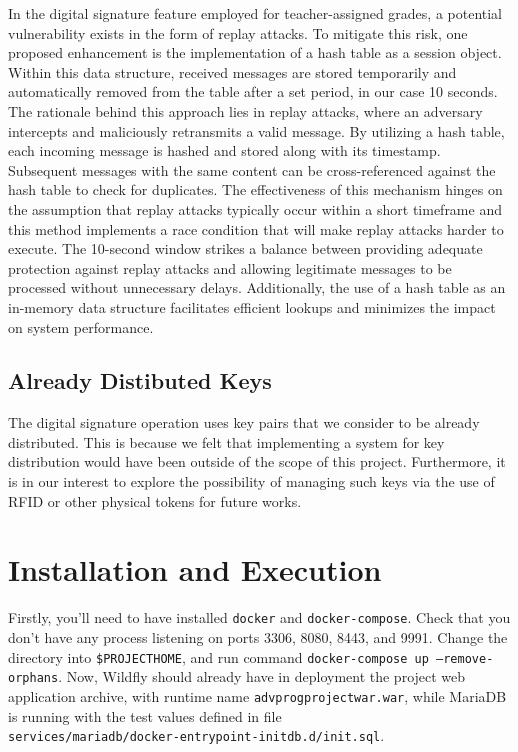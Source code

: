 In the digital signature feature employed for teacher-assigned grades, a potential vulnerability exists in the form of replay attacks. To mitigate this risk, one proposed enhancement is the implementation of a hash table as a session object. Within this data structure, received messages are stored temporarily and automatically removed from the table after a set period, in our case 10 seconds. The rationale behind this approach lies in replay attacks, where an adversary intercepts and maliciously retransmits a valid message. By utilizing a hash table, each incoming message is hashed and stored along with its timestamp. Subsequent messages with the same content can be cross-referenced against the hash table to check for duplicates. The effectiveness of this mechanism hinges on the assumption that replay attacks typically occur within a short timeframe and this method implements a race condition that will make replay attacks harder to execute. The 10-second window strikes a balance between providing adequate protection against replay attacks and allowing legitimate messages to be processed without unnecessary delays. Additionally, the use of a hash table as an in-memory data structure facilitates efficient lookups and minimizes the impact on system performance.

\section{Already Distibuted Keys}

The digital signature operation uses key pairs that we consider to be already distributed. This is because we felt that implementing a system for key distribution would have been outside of the scope of this project. Furthermore, it is in our interest to explore the possibility of managing such keys via the use of RFID or other physical tokens for future works.

\newpage
\chapter{Installation and Execution}

Firstly, you'll need to have installed \texttt{docker} and \texttt{docker-compose}. Check that you don't have any process listening on ports 3306, 8080, 8443, and 9991. Change the directory into \texttt{\$PROJECT\textunderscore HOME}, and run command \texttt{docker-compose up --remove-orphans}. Now, Wildfly should already have in deployment the project web application archive, with runtime name \texttt{adv\textunderscore prog\textunderscore project\textunderscore war.war}, while MariaDB is running with the test values defined in file \\\texttt{services/mariadb/docker-entrypoint-initdb.d/init.sql}.

